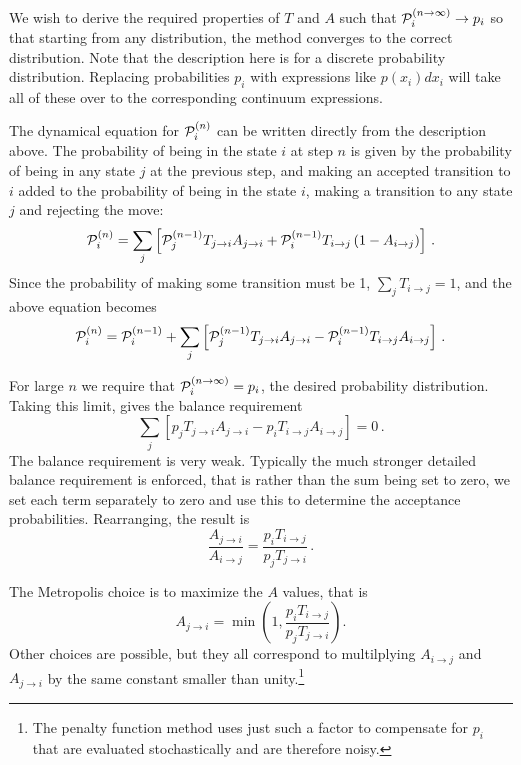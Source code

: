 \documentclass[graybox,sectrefs,envcountresetchap,open=right]{svmonodo}
\begin{document}
\noindent
We wish to derive the required properties of $T$ and $A$ such that
${\cal P}_i^{(n\rightarrow \infty)} \rightarrow p_i$ so that starting
from any distribution, the method converges to the correct distribution.
Note that the description here is for a discrete probability distribution.
Replacing probabilities $p_i$ with expressions like $p(x_i)dx_i$ will
take all of these over to the corresponding continuum expressions.





The dynamical equation for ${\cal P}_i^{(n)}$ can be written directly from
the description above. The probability of being in the state $i$ at step $n$
is given by the probability of being in any state $j$ at the previous step,
and making an accepted transition to $i$ added to the probability of
being in the state $i$, making a transition to any state $j$ and
rejecting the move:
\[
{\cal P}^{(n)}_i = \sum_j \left [
{\cal P}^{(n-1)}_jT_{j\rightarrow i} A_{j\rightarrow i} 
+{\cal P}^{(n-1)}_iT_{i\rightarrow j}\left ( 1- A_{i\rightarrow j} \right)
\right ] \,.
\]
Since the probability of making some transition must be 1,
$\sum_j T_{i\rightarrow j} = 1$, and the above equation becomes
\[
{\cal P}^{(n)}_i = {\cal P}^{(n-1)}_i +
 \sum_j \left [
{\cal P}^{(n-1)}_jT_{j\rightarrow i} A_{j\rightarrow i} 
-{\cal P}^{(n-1)}_iT_{i\rightarrow j}A_{i\rightarrow j}
\right ] \,.
\]




For large $n$ we require that ${\cal P}^{(n\rightarrow \infty)}_i = p_i$,
the desired probability distribution. Taking this limit, gives the
balance requirement
\[
 \sum_j \left [
p_jT_{j\rightarrow i} A_{j\rightarrow i}
-p_iT_{i\rightarrow j}A_{i\rightarrow j}
\right ] = 0 \,.
\]
The balance requirement is very weak. Typically the much stronger detailed
balance requirement is enforced, that is rather than the sum being
set to zero, we set each term separately to zero and use this
to determine the acceptance probabilities. Rearranging, the result is
\[
\frac{ A_{j\rightarrow i}}{A_{i\rightarrow j}}
= \frac{p_iT_{i\rightarrow j}}{ p_jT_{j\rightarrow i}} \,.
\]



The Metropolis choice is to maximize the $A$ values, that is
\[
A_{j \rightarrow i} = \min \left ( 1,
\frac{p_iT_{i\rightarrow j}}{ p_jT_{j\rightarrow i}}\right ).
\]
Other choices are possible, but they all correspond to multilplying
$A_{i\rightarrow j}$ and $A_{j\rightarrow i}$ by the same constant
smaller than unity.\footnote{The penalty function method uses just such
a factor to compensate for $p_i$ that are evaluated stochastically
and are therefore noisy.}
\end{document}

